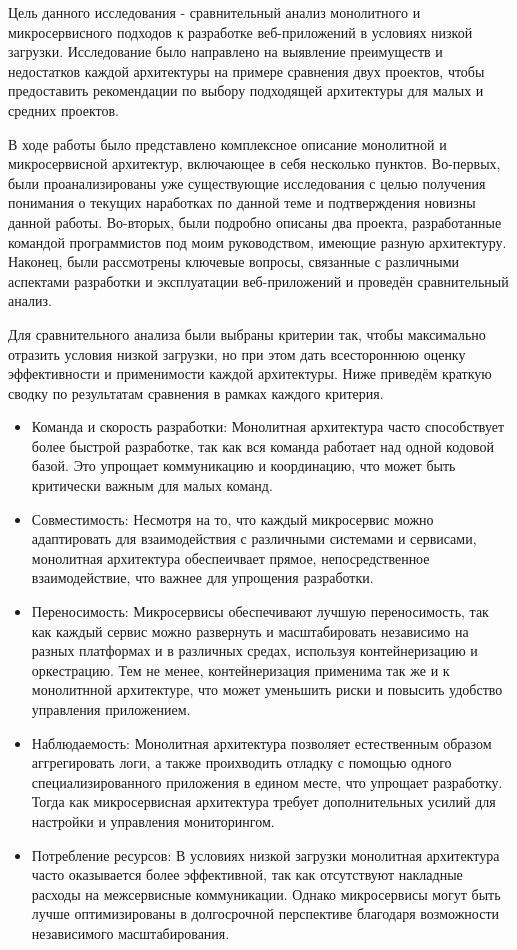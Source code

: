 
    Цель данного исследования - сравнительный анализ монолитного и микросервисного подходов к разработке веб-приложений в условиях низкой загрузки. Исследование было направлено на выявление преимуществ и недостатков каждой архитектуры на примере сравнения двух проектов, чтобы предоставить рекомендации по выбору подходящей архитектуры для малых и средних проектов.

    В ходе работы было представлено комплексное описание монолитной и микросервисной архитектур, включающее в себя несколько пунктов. Во-первых, были проанализированы уже существующие исследования с целью получения понимания о текущих наработках по данной теме и подтверждения новизны данной работы. Во-вторых, были подробно описаны два проекта, разработанные командой программистов под моим руководством, имеющие разную архитектуру. Наконец, были рассмотрены ключевые вопросы, связанные с различными аспектами разработки и эксплуатации веб-приложений и проведён сравнительный анализ.

    Для сравнительного анализа были выбраны критерии так, чтобы максимально отразить условия низкой загрузки, но при этом дать всестороннюю оценку эффективности и применимости каждой архитектуры. Ниже приведём краткую сводку по результатам сравнения в рамках каждого критерия.

    \begin{itemize}
        \item Команда и скорость разработки: Монолитная архитектура часто способствует более быстрой разработке, так как вся команда работает над одной кодовой базой. Это упрощает коммуникацию и координацию, что может быть критически важным для малых команд.
        \item Совместимость: Несмотря на то, что каждый микросервис можно адаптировать для взаимодействия с различными системами и сервисами, монолитная архитектура обеспеичвает прямое, непосредственное взаимодействие, что важнее для упрощения разработки.
        \item Переносимость: Микросервисы обеспечивают лучшую переносимость, так как каждый сервис можно развернуть и масштабировать независимо на разных платформах и в различных средах, используя контейнеризацию и оркестрацию. Тем не менее, контейнеризация применима так же и к монолитнной архитектуре, что может уменьшить риски и повысить удобство управления приложением.
        \item Наблюдаемость: Монолитная архитектура позволяет естественным образом аггрегировать логи, а также проихводить отладку с помощью одного специализированного приложения в едином месте, что упрощает разработку. Тогда как микросервисная архитектура требует дополнительных усилий для настройки и управления мониторингом.
        \item Потребление ресурсов: В условиях низкой загрузки монолитная архитектура часто оказывается более эффективной, так как отсутствуют накладные расходы на межсервисные коммуникации. Однако микросервисы могут быть лучше оптимизированы в долгосрочной перспективе благодаря возможности независимого масштабирования.
    \end{itemize}

